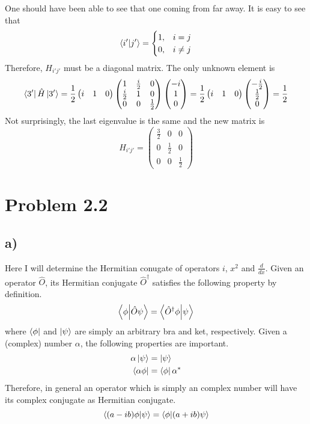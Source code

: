 \documentclass{article}
\newcommand*\colvec[3][]{
    \begin{pmatrix}\ifx\relax#1\relax\else#1\\\fi#2\\#3\end{pmatrix}
}
\begin{document}
One should have been able to see that one coming from far away. It is easy to see that 
\begin{equation}
\braket{i'}{j'}=
\begin{cases}
1, & i=j\\
0, & i\neq j
\end{cases}
\end{equation}
Therefore, $H_{i'j'}$ must be a diagonal matrix. The only unknown element is
\begin{equation}
\bra{3'}\hat{H}\ket{3'}=
\frac{1}{2}\begin{pmatrix}
i & 1 & 0
\end{pmatrix}\begin{pmatrix}
1 & \frac{i}{2} & 0 \\
\frac{i}{2} & 1 & 0 \\
0 & 0 & \frac{1}{2}
\end{pmatrix}
\colvec[-i]{1}{0}=
\frac{1}{2}\begin{pmatrix}
i & 1 & 0
\end{pmatrix}
\colvec[-\frac{i}{2}]{\frac{1}{2}}{0}=\frac{1}{2}
\end{equation}
Not surprisingly, the last eigenvalue is the same and the new matrix is
\begin{equation}
H_{i'j'}=\begin{pmatrix}
\frac{3}{2} & 0 & 0 \\
0 & \frac{1}{2} & 0 \\
0 & 0 & \frac{1}{2}
\end{pmatrix}
\end{equation}

\section*{Problem 2.2}
\subsection*{a)}
Here I will determine the Hermitian conugate of operators $i$, $x^2$ and $\frac{d}{dx}$. Given an operator $\hat{O}$, its Hermitian conjugate $\hat{O}^{\dagger}$ satisfies the following property by definition.
\begin{equation}
\label{hermconj}
\braket{\phi}{\hat{O}\psi} = \braket{\hat{O}^{\dagger}\phi}{\psi} 
\end{equation} 
where $\bra{\phi}$ and $\ket{\psi}$ are simply an arbitrary bra and ket, respectively. Given a (complex) number $\alpha$, the following properties are important.
\begin{align}
\alpha\ket{\psi} &= \ket{\psi} \\
\bra{\alpha\phi} &= \bra{\phi}\alpha^*
\end{align}
Therefore, in general an operator which is simply an complex number will have its complex conjugate as Hermitian conjugate.
\begin{equation}
\braket{(a-ib)\phi}{\psi}=\braket{\phi}{(a+ib)\psi}
\end{equation}
\end{document}
